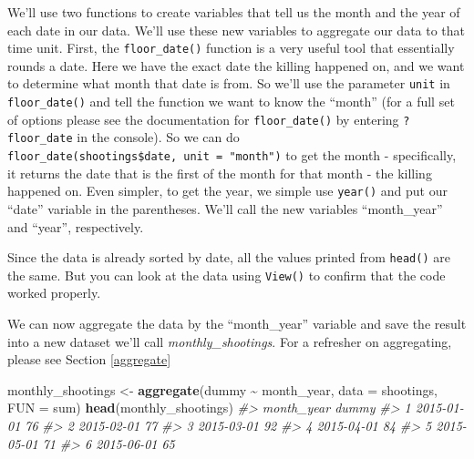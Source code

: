 \documentclass[
  12pt,
]{book}
\newenvironment{Shaded}{\begin{snugshade}}{\end{snugshade}}
\newcommand{\CommentTok}[1]{\textcolor[rgb]{0.37,0.37,0.37}{\textit{#1}}}
\newcommand{\DataTypeTok}[1]{\textcolor[rgb]{0.27,0.27,0.27}{#1}}
\newcommand{\KeywordTok}[1]{\textcolor[rgb]{0.27,0.27,0.27}{\textbf{#1}}}
\newcommand{\NormalTok}[1]{#1}
\newcommand{\OperatorTok}[1]{\textcolor[rgb]{0.43,0.43,0.43}{\textbf{#1}}}
\newcommand{\StringTok}[1]{\textcolor[rgb]{0.5,0.5,0.5}{#1}}
\begin{document}
We'll use two functions to create variables that tell us the month and the year of each date in our data. We'll use these new variables to aggregate our data to that time unit. First, the \texttt{floor\_date()} function is a very useful tool that essentially rounds a date. Here we have the exact date the killing happened on, and we want to determine what month that date is from. So we'll use the parameter \texttt{unit} in \texttt{floor\_date()} and tell the function we want to know the ``month'' (for a full set of options please see the documentation for \texttt{floor\_date()} by entering \texttt{?floor\_date} in the console). So we can do \texttt{floor\_date(shootings\$date,\ unit\ =\ "month")} to get the month - specifically, it returns the date that is the first of the month for that month - the killing happened on. Even simpler, to get the year, we simple use \texttt{year()} and put our ``date'' variable in the parentheses. We'll call the new variables ``month\_year'' and ``year'', respectively.

\begin{Shaded}
\end{Shaded}

Since the data is already sorted by date, all the values printed from \texttt{head()} are the same. But you can look at the data using \texttt{View()} to confirm that the code worked properly.

We can now aggregate the data by the ``month\_year'' variable and save the result into a new dataset we'll call \emph{monthly\_shootings}. For a refresher on aggregating, please see Section \ref{aggregate}

\begin{Shaded}
\begin{Highlighting}[]
\NormalTok{monthly\_shootings <{-}}\StringTok{ }\KeywordTok{aggregate}\NormalTok{(dummy }\OperatorTok{\textasciitilde{}}\StringTok{ }\NormalTok{month\_year, }\DataTypeTok{data =}\NormalTok{ shootings, }\DataTypeTok{FUN =}\NormalTok{ sum)}
\KeywordTok{head}\NormalTok{(monthly\_shootings)}
\CommentTok{\#>   month\_year dummy}
\CommentTok{\#> 1 2015{-}01{-}01    76}
\CommentTok{\#> 2 2015{-}02{-}01    77}
\CommentTok{\#> 3 2015{-}03{-}01    92}
\CommentTok{\#> 4 2015{-}04{-}01    84}
\CommentTok{\#> 5 2015{-}05{-}01    71}
\CommentTok{\#> 6 2015{-}06{-}01    65}
\end{Highlighting}
\end{Shaded}
\end{document}
